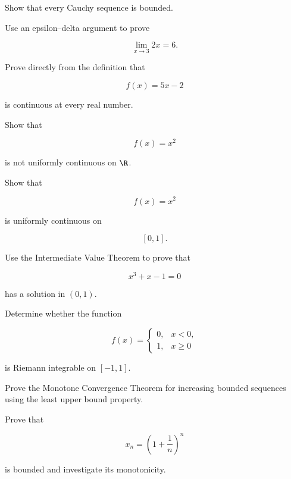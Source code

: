 \begin{exercise}[2]
Show that every Cauchy sequence is bounded.
\end{exercise}

\begin{exercise}[2]
Use an epsilon--delta argument to prove

\[
\lim_{x\to3}2x=6.
\]
\end{exercise}

\begin{exercise}[2]
Prove directly from the definition that

\[
f(x)=5x-2
\]

is continuous at every real number.
\end{exercise}

\begin{exercise}[2]
Show that

\[
f(x)=x^2
\]

is not uniformly continuous on \(\R\).
\end{exercise}

\begin{exercise}[2]
Show that

\[
f(x)=x^2
\]

is uniformly continuous on

\[
[0,1].
\]
\end{exercise}

\begin{exercise}[2]
Use the Intermediate Value Theorem to prove that

\[
x^3+x-1=0
\]

has a solution in \((0,1)\).
\end{exercise}

\begin{exercise}[2]
Determine whether the function

\[
f(x)=
\begin{cases}
0, & x<0,\\
1, & x\geq0
\end{cases}
\]

is Riemann integrable on \([-1,1]\).
\end{exercise}

\begin{exercise}[3]
Prove the Monotone Convergence Theorem for increasing bounded sequences
using the least upper bound property.
\end{exercise}

\begin{exercise}[3]
Prove that

\[
x_n=\left(1+\frac1n\right)^n
\]

is bounded and investigate its monotonicity.
\end{exercise}

